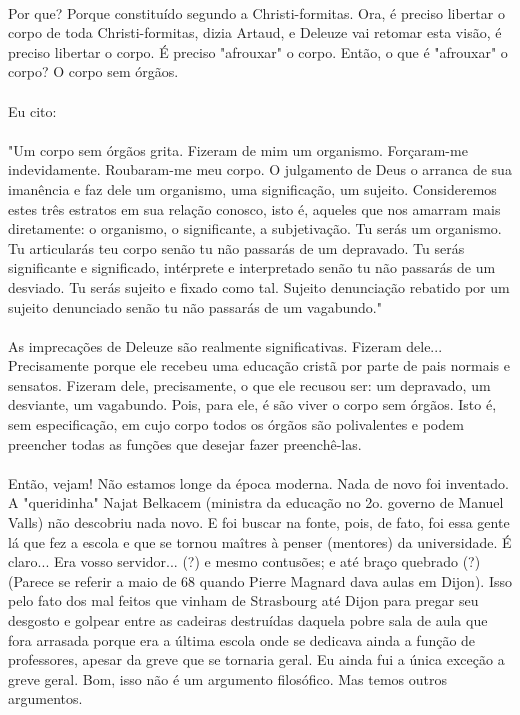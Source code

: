 \documentclass[10pt,a4paper]{book}
\begin{document}
	\\
	Por que? Porque constituído segundo a Christi-formitas. Ora, é preciso libertar o corpo de toda Christi-formitas, dizia Artaud, e Deleuze vai retomar esta visão, é preciso libertar o corpo. É preciso "afrouxar" o corpo. Então, o que é "afrouxar" o corpo? O corpo sem órgãos.\\
	\\
	Eu cito:\\
	\\
	"Um corpo sem órgãos grita. Fizeram de mim um organismo. Forçaram-me indevidamente. Roubaram-me meu corpo. O julgamento de Deus o  arranca de sua imanência e faz dele um organismo, uma significação, um sujeito. Consideremos estes três estratos em sua relação conosco, isto é, aqueles que nos amarram mais diretamente: o organismo, o significante, a subjetivação. Tu serás um organismo. Tu articularás teu corpo senão tu não passarás de um depravado. Tu serás significante e significado, intérprete e interpretado senão tu não passarás de um desviado. Tu serás sujeito e fixado como tal. Sujeito denunciação rebatido por um sujeito denunciado senão tu não passarás de um vagabundo."\\
	\\
	As imprecações de Deleuze são realmente significativas. Fizeram dele... Precisamente porque ele recebeu uma educação cristã por parte de pais normais e sensatos. Fizeram dele, precisamente, o que ele recusou ser: um depravado, um desviante, um vagabundo. Pois, para ele, é são viver o corpo sem órgãos. Isto é, sem especificação, em cujo corpo todos os órgãos são polivalentes e podem preencher todas as funções que desejar fazer preenchê-las.\\
	\\
	Então, vejam! Não estamos longe da época moderna. Nada de novo foi inventado. A "queridinha" Najat Belkacem (ministra da educação no 2o. governo de Manuel Valls) não descobriu nada novo. E foi buscar na fonte, pois, de fato, foi essa gente lá que fez a escola e que se tornou maîtres à penser (mentores) da universidade. É claro... Era vosso servidor... (?) e mesmo contusões; e até braço quebrado (?) (Parece se referir a maio de 68 quando Pierre Magnard dava aulas em Dijon). Isso pelo fato dos mal feitos que vinham de Strasbourg até Dijon para pregar seu desgosto e golpear entre as cadeiras destruídas daquela pobre sala de aula que fora arrasada porque era a última escola onde se dedicava ainda a função de professores, apesar da greve que se tornaria geral. Eu ainda fui a única exceção a greve geral. Bom, isso não é um argumento filosófico. Mas temos outros argumentos.\\
\end{document}
